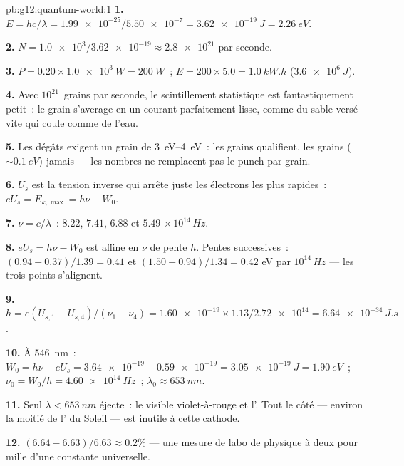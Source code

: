 \begin{solution}{pb:g12:quantum-world:1}
\textbf{1.} $E = hc/\lambda = \num{1.99e-25}/\num{5.50e-7} =
\qty{3.62e-19}{J} = \qty{2.26}{eV}$.

\textbf{2.} $N = \num{1.0e3}/\num{3.62e-19} \approx \num{2.8e21}$
 par seconde.

\textbf{3.} $P = 0.20 \times \qty{1.0e3}{W} = \qty{200}{W}$~;
$E = 200 \times 5.0 = \qty{1.0}{kW.h}$ ($\qty{3.6e6}{J}$).

\textbf{4.} Avec $10^{21}$~grains par seconde, le scintillement
statistique est fantastiquement petit~: le grain s'average en un
courant parfaitement lisse, comme du sable versé vite qui coule comme
de l'eau.

\textbf{5.} Les dégâts exigent un grain de \qtyrange{3}{4}{eV}~: les
grains  qualifient, les grains
 ($\sim \qty{0.1}{eV}$) jamais ---
les nombres ne remplacent pas le punch par grain.

\textbf{6.} $U_s$ est la tension inverse qui
arrête juste les électrons les plus rapides~:
$eU_s = E_{k,\max} = h\nu - W_0$.

\textbf{7.} $\nu = c/\lambda$~: $8.22$, $7.41$, $6.88$ et $5.49$
$\times\,10^{14}\,\unit{Hz}$.

\textbf{8.} $eU_s = h\nu - W_0$ est affine en $\nu$ de pente $h$.
Pentes successives~: $(0.94 - 0.37)/1.39 = 0.41$ et
$(1.50 - 0.94)/1.34 = 0.42$ \unit{eV} par $10^{14}\,\unit{Hz}$ ---
les trois points s'alignent.

\textbf{9.} $h = e(U_{s,1}-U_{s,4})/(\nu_1-\nu_4) = \num{1.60e-19}
\times 1.13/\num{2.72e14} = \qty{6.64e-34}{J.s}$.

\textbf{10.} À \qty{546}{nm}~: $W_0 = h\nu - eU_s = \num{3.64e-19} -
\num{0.59e-19} = \qty{3.05e-19}{J} = \qty{1.90}{eV}$~;
$\nu_0 = W_0/h = \qty{4.60e14}{Hz}$~; $\lambda_0 \approx \qty{653}{nm}$.

\textbf{11.} Seul $\lambda < \qty{653}{nm}$ éjecte~: le visible
violet-à-rouge et l'. Tout le côté
 --- environ la moitié de
l' du Soleil --- est inutile à cette
cathode.

\textbf{12.} $(6.64 - 6.63)/6.63 \approx 0.2\%$ --- une mesure de
labo de physique à deux pour mille d'une constante universelle.


\end{solution}
